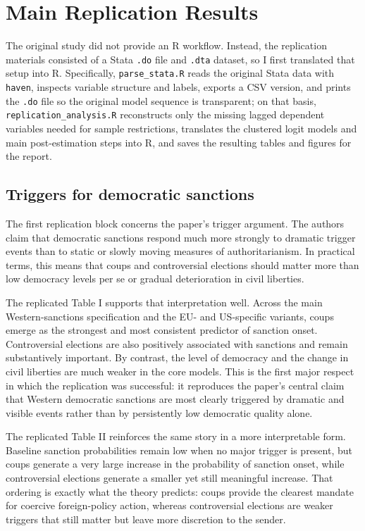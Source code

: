 \documentclass[12pt,letterpaper]{article}
\begin{document}
	\section{Main Replication Results}
	
	The original study did not provide an R workflow. Instead, the replication materials consisted of a Stata \texttt{.do} file and \texttt{.dta} dataset, so I first translated that setup into R. Specifically, \texttt{parse\_stata.R} reads the original Stata data with \texttt{haven}, inspects variable structure and labels, exports a CSV version, and prints the \texttt{.do} file so the original model sequence is transparent; on that basis, \texttt{replication\_analysis.R} reconstructs only the missing lagged dependent variables needed for sample restrictions, translates the clustered logit models and main post-estimation steps into R, and saves the resulting tables and figures for the report.	
	
	\subsection*{Triggers for democratic sanctions}
	
	The first replication block concerns the paper's trigger argument. The authors claim that democratic sanctions respond much more strongly to dramatic trigger events than to static or slowly moving measures of authoritarianism. In practical terms, this means that coups and controversial elections should matter more than low democracy levels per se or gradual deterioration in civil liberties.
	
	

	The replicated Table I supports that interpretation well. Across the main Western-sanctions specification and the EU- and US-specific variants, coups emerge as the strongest and most consistent predictor of sanction onset. Controversial elections are also positively associated with sanctions and remain substantively important. By contrast, the level of democracy and the change in civil liberties are much weaker in the core models. This is the first major respect in which the replication was successful: it reproduces the paper's central claim that Western democratic sanctions are most clearly triggered by dramatic and visible events rather than by persistently low democratic quality alone.
	
	
	
	The replicated Table II reinforces the same story in a more interpretable form. Baseline sanction probabilities remain low when no major trigger is present, but coups generate a very large increase in the probability of sanction onset, while controversial elections generate a smaller yet still meaningful increase. That ordering is exactly what the theory predicts: coups provide the clearest mandate for coercive foreign-policy action, whereas controversial elections are weaker triggers that still matter but leave more discretion to the sender.
	
\end{document}
